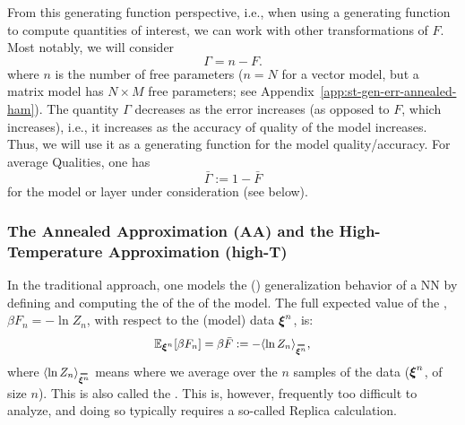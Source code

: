 {From this generating function perspective, i.e., when using a generating function to compute quantities of interest, we can work with other transformations of $F$.
Most notably, we will consider 
\begin{equation}
    \Gamma = n-F .
\end{equation}
where $n$ is the number of free parameters ($n=N$ for a vector model, but a matrix model has $N\times M$ free parameters; see Appendix~\ref{app:st-gen-err-annealed-ham}).
The quantity $\Gamma$ decreases as the error increases (as opposed to $F$, which increases), i.e., it increases as the accuracy of quality of the model increases.
Thus, we will use it as a generating function for the model quality/accuracy.
For average Qualities, one has
\begin{equation} 
\label{eqn:GammaBar}
 \bar{\Gamma}:=1-\bar{F}
\end{equation} %
for the model or layer under consideration (see below).


\subsubsection{The Annealed Approximation (AA) and the High-Temperature Approximation (high-T)}
\label{sxn:mathP_annealed}

In the traditional \SMOG approach, one models the (\Typical) generalization behavior of a NN
by defining and computing the \ExpectedValue of the \FreeEnergy of the model.
The full expected value  of the \FreeEnergy, $\beta F_{n}=-\ln Z_{n}$, with respect to the (model) data $\boldsymbol{\xi}^{n}$, is:
\begin{align}
\label{eqn_mm_f_b ar}
  \mathbb{E}_{\NDXIn}[\beta F_n]=\beta\bar{F}:=-\langle \ln Z_{n}\rangle_{\AVGNDXIn},
\end{align}
where $\langle \ln Z_{n}\rangle_{\AVGNDXIn}$ means where we average over  the $n$ samples of the data ($\boldsymbol{\xi}^{n}$, of size $n$).  This is also called the \Quenched \FreeEnergy.
This is, however,  frequently too difficult to analyze, and doing so typically
requires a so-called Replica calculation. 

}
